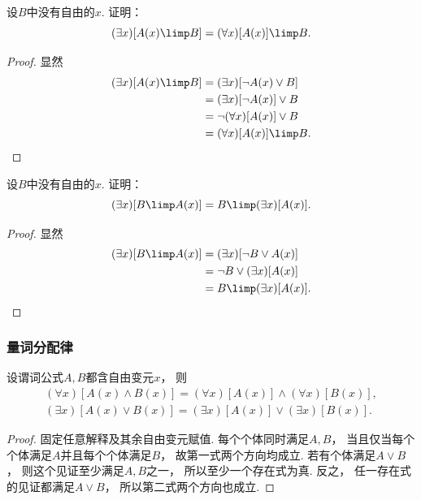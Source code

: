 \begin{example}
    设\(B\)中没有自由的\(x\).
证明：\begin{equation}
	(\exists x)[A(x) \limp B]
	= (\forall x)[A(x)] \limp B.
\end{equation}
\begin{proof}
显然\begin{align*}
	(\exists x)[A(x) \limp B]
	&= (\exists x)[\neg A(x) \lor B] \\
	&= (\exists x)[\neg A(x)] \lor B \\
	&= \neg(\forall x)[A(x)] \lor B \\
	&= (\forall x)[A(x)] \limp B.
	\qedhere
\end{align*}
\end{proof}
\end{example}

\begin{example}
    设\(B\)中没有自由的\(x\).
证明：\begin{equation}
	(\exists x)[B \limp A(x)]
	= B \limp (\exists x)[A(x)].
\end{equation}
\begin{proof}
显然\begin{align*}
	(\exists x)[B \limp A(x)]
	&= (\exists x)[\neg B \lor A(x)] \\
	&= \neg B \lor (\exists x)[A(x)] \\
	&= B \limp (\exists x)[A(x)].
	\qedhere
\end{align*}
\end{proof}
\end{example}

\subsubsection{量词分配律}
设谓词公式\(A,B\)都含自由变元\(x\)，
则\begin{gather}
	(\forall x)[A(x) \land B(x)]
	= (\forall x)[A(x)] \land (\forall x)[B(x)], \\
	(\exists x)[A(x) \lor B(x)]
	= (\exists x)[A(x)] \lor (\exists x)[B(x)].
\end{gather}
\begin{proof}
    固定任意解释及其余自由变元赋值.
    每个个体同时满足\(A,B\)，
    当且仅当每个个体满足\(A\)并且每个个体满足\(B\)，
    故第一式两个方向均成立.
    若有个体满足\(A\lor B\)，
    则这个见证至少满足\(A,B\)之一，
    所以至少一个存在式为真.
    反之，
    任一存在式的见证都满足\(A\lor B\)，
    所以第二式两个方向也成立.
\end{proof}

